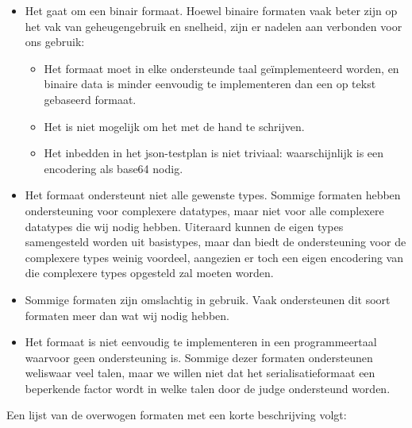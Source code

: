 \begin{itemize}
    \item Het gaat om een binair formaat.
    Hoewel binaire formaten vaak beter zijn op het vak van geheugengebruik en snelheid, zijn er nadelen aan verbonden voor ons gebruik:
    \begin{itemize}
        \item Het formaat moet in elke ondersteunde taal geïmplementeerd worden, en binaire data is minder eenvoudig te implementeren dan een op tekst gebaseerd formaat.
        \item Het is niet mogelijk om het met de hand te schrijven.
        \item Het inbedden in het json-testplan is niet triviaal: waarschijnlijk is een encodering als base64 nodig.
    \end{itemize}
    \item Het formaat ondersteunt niet alle gewenste types.
    Sommige formaten hebben ondersteuning voor complexere datatypes, maar niet voor alle complexere datatypes die wij nodig hebben.
    Uiteraard kunnen de eigen types samengesteld worden uit basistypes, maar dan biedt de ondersteuning voor de complexere types weinig voordeel, aangezien er toch een eigen encodering van die complexere types opgesteld zal moeten worden.
    \item Sommige formaten zijn omslachtig in gebruik.
    Vaak ondersteunen dit soort formaten meer dan wat wij nodig hebben.
    \item Het formaat is niet eenvoudig te implementeren in een programmeertaal waarvoor geen ondersteuning is.
    Sommige dezer formaten ondersteunen weliswaar veel talen, maar we willen niet dat het serialisatieformaat een beperkende factor wordt in welke talen door de judge ondersteund worden.
\end{itemize}

Een lijst van de overwogen formaten met een korte beschrijving volgt:


